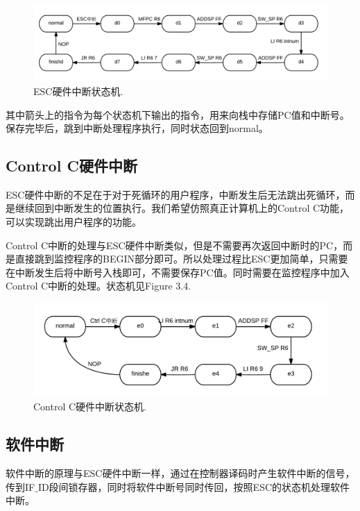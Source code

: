 \begin{figure}[H]
  \includegraphics[width=\linewidth]{Figures/escint.png}
  \caption{ESC硬件中断状态机.}
\end{figure}

其中箭头上的指令为每个状态机下输出的指令，用来向栈中存储PC值和中断号。保存完毕后，跳到中断处理程序执行，同时状态回到normal。

\subsection{Control C硬件中断}

ESC硬件中断的不足在于对于死循环的用户程序，中断发生后无法跳出死循环，而是继续回到中断发生的位置执行。我们希望仿照真正计算机上的Control C功能，可以实现跳出用户程序的功能。

Control C中断的处理与ESC硬件中断类似，但是不需要再次返回中断时的PC，而是直接跳到监控程序的BEGIN部分即可。所以处理过程比ESC更加简单，只需要在中断发生后将中断号入栈即可，不需要保存PC值。同时需要在监控程序中加入Control C中断的处理。状态机见Figure 3.4.

\begin{figure}[H]
  \includegraphics[width=\linewidth]{Figures/ctrl_c.png}
  \caption{Control C硬件中断状态机.}
\end{figure}

\subsection{软件中断}

软件中断的原理与ESC硬件中断一样，通过在控制器译码时产生软件中断的信号，传到IF$\_$ID段间锁存器，同时将软件中断号同时传回，按照ESC的状态机处理软件中断。

